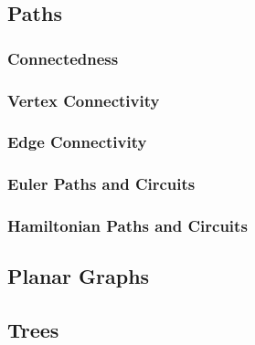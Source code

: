 \documentclass[a4paper, 10pt]{article}
\begin{document}
\subsection{Paths}

\subsubsection{Connectedness}

\subsubsection{Vertex Connectivity}

\subsubsection{Edge Connectivity}

\subsubsection{Euler Paths and Circuits}

\subsubsection{Hamiltonian Paths and Circuits}

\subsection{Planar Graphs}

\subsection{Trees}
\end{document}
